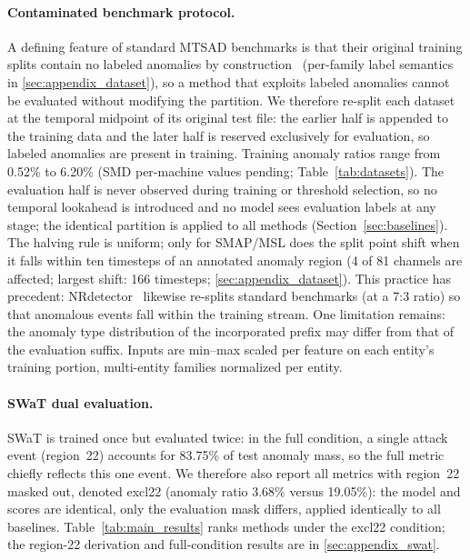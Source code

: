 \paragraph{Contaminated benchmark protocol.}
A defining feature of standard MTSAD benchmarks is that their original training splits contain
no labeled anomalies by construction~\cite{goh2016swat,ahmed2017wadi,abdulaal2021psm,%
su2019omnianomaly,hundman2018telemanom} (per-family label semantics in
\ref{sec:appendix_dataset}), so a method that exploits labeled anomalies cannot be
evaluated without modifying the partition.
We therefore re-split each dataset at the temporal midpoint of its original test file: the earlier
half is appended to the training data and the later half is reserved exclusively for evaluation,
so labeled anomalies are present in training.
Training anomaly ratios range from 0.52\% to 6.20\% (SMD per-machine values pending;
Table~\ref{tab:datasets}).
The evaluation half is never observed during training or threshold selection, so no temporal
lookahead is introduced and no model sees evaluation labels at any stage; the identical partition
is applied to all methods (Section~\ref{sec:baselines}).
The halving rule is uniform; only for SMAP/MSL does the split point shift when it falls within
ten timesteps of an annotated anomaly region (4 of 81 channels are affected; largest shift:
166 timesteps; \ref{sec:appendix_dataset}).
This practice has precedent: NRdetector~\cite{wang2025nrdetector} likewise re-splits standard
benchmarks (at a 7:3 ratio) so that anomalous events fall within the training stream.
One limitation remains: the anomaly type distribution of the incorporated prefix may differ from
that of the evaluation suffix.
Inputs are min--max scaled per feature on each entity's training portion, multi-entity families
normalized per entity.

\paragraph{SWaT dual evaluation.}
SWaT is trained once but evaluated twice: in the full condition, a single attack event (region~22)
accounts for 83.75\% of test anomaly mass, so the full metric chiefly reflects this one event.
We therefore also report all metrics with region~22 masked out, denoted excl22
(anomaly ratio 3.68\% versus 19.05\%): the model and scores are identical, only the evaluation
mask differs, applied identically to all baselines.
Table~\ref{tab:main_results} ranks methods under the excl22 condition; the region-22 derivation
and full-condition results are in \ref{sec:appendix_swat}.

